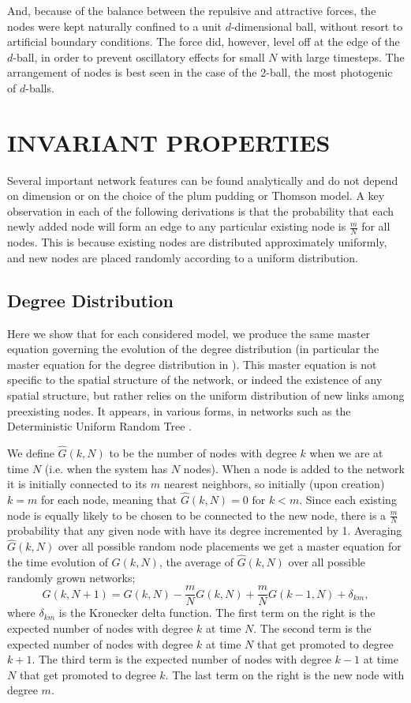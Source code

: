 \documentclass[aps,pre,reprint,superscriptaddress,amsmath,amssymb,nofootinbib]{revtex4-1}
\begin{document}
And, because of the balance between the repulsive and attractive forces, the nodes were kept naturally confined to a unit $d$-dimensional ball, without resort to artificial boundary conditions.  
The force did, however, level off at the edge of the $d$-ball, in order to prevent oscillatory effects for small $N$ with large timesteps.  
The arrangement of nodes is best seen in the case of the 2-ball, the most photogenic of $d$-balls.  

\section{INVARIANT PROPERTIES}
Several important network features can be found analytically and do not depend on dimension or on the choice of the plum pudding or Thomson model.
A key observation in each of the following derivations is that the probability that each newly added node will form an edge to any particular existing node is $\frac{m}{N}$ for all nodes.
This is because existing nodes are distributed approximately uniformly, and new nodes are placed randomly according to a uniform distribution.

\subsection{Degree Distribution}
Here we show that for each considered model, we produce the same master equation governing the evolution of the degree distribution (in particular the master equation for the degree distribution in \cite{ozik2004}).  
This master equation is not specific to the spatial structure of the network, or indeed the existence of any spatial structure, but rather relies on the uniform distribution of new links among preexisting nodes.  
It appears, in various forms, in networks such as the Deterministic Uniform Random Tree \cite{zhang2008topologies}.

We define $\hat{G}(k,N)$ to be the number of nodes with degree $k$ when we are at time $N$ (i.e. when the system has $N$ nodes).
When a node is added to the network it is initially connected to its $m$ nearest neighbors, so initially (upon creation) $k = m$ for each node, meaning that $\hat{G}(k,N) = 0 \text{ for } k < m$.
Since each existing node is equally likely to be chosen to be connected to the new node, there is a $\frac{m}{N}$ probability that any given node with have its degree incremented by 1.
Averaging $\hat{G}(k,N)$ over all possible random node placements we get a master equation for the time evolution of $G(k,N)$, the average of $\hat{G}(k,N)$ over all possible randomly grown networks;
\begin{equation}
G(k,N+1) = G(k,N) - \frac{m}{N}G(k,N) + \frac{m}{N}G(k-1,N) + \delta_{km},
\end{equation}
\noindent where $\delta_{km}$ is the Kronecker delta function.
The first term on the right is the expected number of nodes with degree $k$ at time $N$.
The second term is the expected number of nodes with degree $k$ at time $N$ that get promoted to degree $k+1$.
The third term is the expected number of nodes with degree $k-1$ at time $N$ that get promoted to degree $k$.
The last term on the right is the new node with degree $m$.
\end{document}
